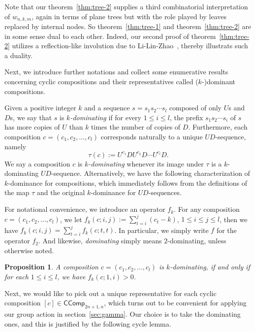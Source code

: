 \documentclass[reqno]{amsart}
\numberwithin{equation}{section}
\newtheorem{proposition}[theorem]{Proposition}
\theoremstyle{definition}
\theoremstyle{named}
\def\CComp{\mathsf{CComp}}
\begin{document}
Note that our theorem~\ref{thm:tree-2} supplies a third combinatorial interpretation of $w_{n,k,m}$, again in terms of plane trees but with the role played by leaves replaced by internal nodes. So theorem~\ref{thm:tree-1} and theorem~\ref{thm:tree-2} are in some sense dual to each other. Indeed, our second proof of theorem~\ref{thm:tree-2} utilizes a reflection-like involution due to Li-Lin-Zhao~\cite{LLZ2024}, thereby illustrats such a duality.

Next, we introduce further notations and collect some enumerative results concerning cyclic compositions and their representatives called ($k$-)dominant compositions.

Given a positive integer $k$ and a sequence $s=s_1s_2\cdots s_l$ composed of only $U$s and $D$s, we say that $s$ is {\it $k$-dominating} if for every $1\le i\le l$, the prefix $s_1s_2\cdots s_i$ of $s$ has more copies of $U$ than $k$ times the number of copies of $D$. Furthermore, each composition $c=(c_1,c_2,\ldots,c_l)$ corresponds naturally to a unique $UD$-sequence, namely
$$\tau(c):=U^{c_1}DU^{c_2}D\cdots U^{c_l}D.$$
We say a composition $c$ is {\it $k$-dominating} whenever its image under $\tau$ is a $k$-dominating $UD$-sequence. Alternatively, we have the following characterization of $k$-dominance for compositions, which immediately follows from the definitions of the map $\tau$ and the original $k$-dominance for $UD$-sequences.


For notational convenience, we introduce an operator $f_k$. For any composition $c=(c_1,c_2,\ldots,c_l)$, we let $f_k(c;i,j):=\sum_{t=i}^j (c_t-k)$, $1\le i\le j\le l$, then we have $f_k(c;i,j)=\sum_{t=i}^{j} f_k(c;t,t)$. In particular, we simply write $f$ for the operator $f_2$. And likewise, {\it dominating} simply means $2$-dominating, unless otherwise noted.

\begin{proposition}\label{char:k-domi}
A composition $c=(c_1,c_2,\ldots,c_l)$ is $k$-dominating, if and only if for each $1\le i\le l$, we have $f_k(c;1,i)>0$.
\end{proposition}

Next, we would like to pick out a unique representative for each cyclic composition $[c]\in\CComp_{2n+1,n}$, which turns out to be convenient for applying our group action in section~\ref{sec:gamma}. Our choice is to take the dominating ones, and this is justified by the following cycle lemma.
\end{document}
